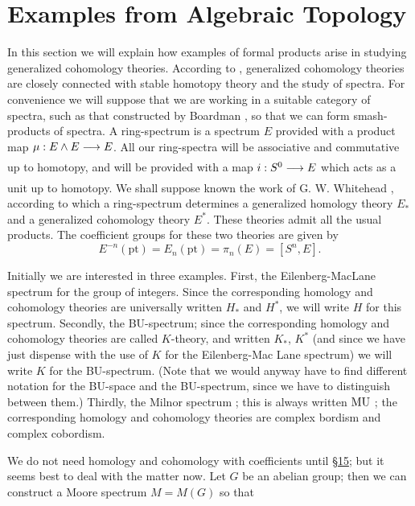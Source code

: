 \documentclass[../main]{subfiles}
\begin{document}

\chapter{Examples from Algebraic Topology}
\label{sec:p2c2}
In this section we will explain how examples of formal products arise in studying generalized cohomology theories. According to \cite{whitehead}, generalized cohomology theories are closely connected with stable homotopy theory and the study of spectra. For convenience we will suppose that we are working in a suitable category of spectra, such as that constructed by Boardman \cite{boardman,boardman2}, so that we can form smash-products of spectra. A ring-spectrum is a spectrum $E$ provided with a product map $\mu : E \wedge E \lar{} E$. All our ring-spectra will be associative and commutative up to homotopy, and will be provided with a map $i : S^0 \lar{} E$ which acts as a unit up to homotopy. We shall suppose known the work of G. W. Whitehead \cite{whitehead}, according to which a ring-spectrum determines a generalized homology theory $E_\ast$ and a generalized cohomology theory $E^\ast$. These theories admit all the usual products. The coefficient groups for these two theories are given by \[E^{-n}(\mathrm{pt}) = E_n(\mathrm{pt}) = \pi_n(E) = [S^n, E].\] 

Initially we are interested in three examples. First, the Eilenberg-MacLane spectrum for the group of integers. Since the corresponding homology and cohomology theories are universally written $H_\ast$ and $H^\ast$, we will write $H$ for this spectrum. Secondly, the BU-spectrum; since the corresponding homology and cohomology theories are called $K$-theory, and written $K_\ast$, $K^\ast$ (and since we have just dispense with the use of $K$ for the Eilenberg-Mac Lane spectrum) we will write $K$ for the BU-spectrum. (Note that we would anyway have to find different notation for the BU-space and the BU-spectrum, since we have to distinguish between them.) Thirdly, the Milnor spectrum \cite{milnor2}; this is always written $\mathrm{MU}$ ; the corresponding homology and cohomology theories are complex bordism and complex cobordism. 

We do not need homology and cohomology with coefficients until \hyperref[sec:p2c15]{\S 15}; but it seems best to deal with the matter now. Let $G$ be an abelian group; then we can construct a Moore spectrum $M = M(G)$ so that 
\end{document}
